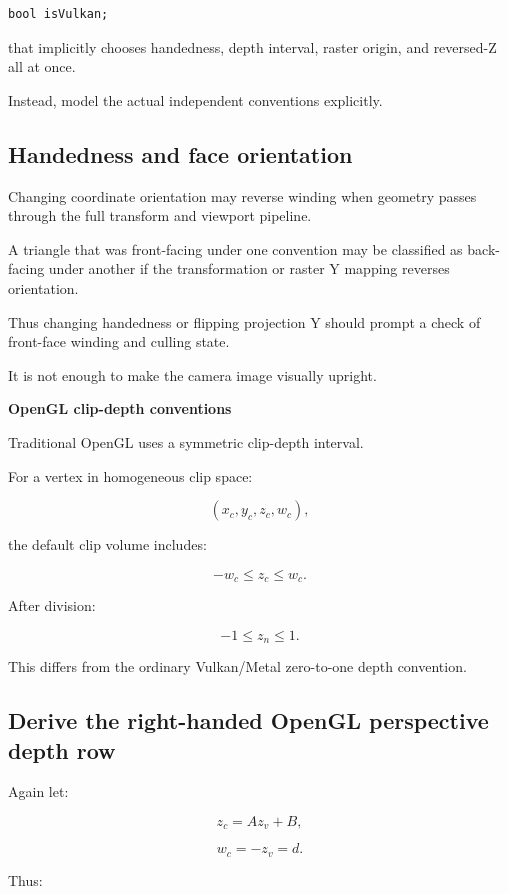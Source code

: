 \begin{verbatim}
bool isVulkan;
\end{verbatim}

that implicitly chooses handedness, depth interval, raster origin, and reversed-Z all at once.

Instead, model the actual independent conventions explicitly.

\subsection{Handedness and face orientation}\label{02-foundations-ii-ch033-handedness-and-face-orientation}

Changing coordinate orientation may reverse winding when geometry passes through the full transform and viewport pipeline.

A triangle that was front-facing under one convention may be classified as back-facing under another if the transformation or raster Y mapping reverses orientation.

Thus changing handedness or flipping projection Y should prompt a check of front-face winding and culling state.

It is not enough to make the camera image visually upright.

\textbf{OpenGL clip-depth conventions}

Traditional OpenGL uses a symmetric clip-depth interval.

For a vertex in homogeneous clip space:

\[
 (x_c,y_c,z_c,w_c),
\]

the default clip volume includes:

\[
 \boxed{-w_c\le z_c\le w_c}.
\]

After division:

\[
 \boxed{-1\le z_n\le1}.
\]

This differs from the ordinary Vulkan/Metal zero-to-one depth convention.

\subsection{Derive the right-handed OpenGL perspective depth row}\label{02-foundations-ii-ch033-derive-the-right-handed-opengl-perspective-depth-row}

Again let:

\[
 z_c=Az_v+B,
\]

\[
 w_c=-z_v=d.
\]

Thus:

